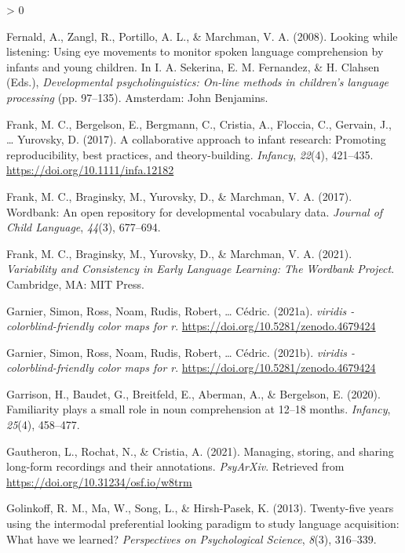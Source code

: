 \documentclass[
  english,
  man,floatsintext]{apa6}
\newlength{\cslhangindent}
\newenvironment{CSLReferences}[2] %
 {%
  \setlength{\parindent}{0pt}
  \ifodd #1 \everypar{\setlength{\hangindent}{\cslhangindent}}\ignorespaces\fi
  \ifnum #2 > 0
  \setlength{\parskip}{#2\baselineskip}
  \fi
 }%
 {}
\begin{document}
\begin{CSLReferences}{1}{0}
\leavevmode\hypertarget{ref-fernald2008}{}%
Fernald, A., Zangl, R., Portillo, A. L., \& Marchman, V. A. (2008). {Looking while listening: Using eye movements to monitor spoken language comprehension by infants and young children}. In I. A. Sekerina, E. M. Fernandez, \& H. Clahsen (Eds.), \emph{Developmental psycholinguistics: On-line methods in children's language processing} (pp. 97--135). Amsterdam: John Benjamins.

\leavevmode\hypertarget{ref-Frank2017a}{}%
Frank, M. C., Bergelson, E., Bergmann, C., Cristia, A., Floccia, C., Gervain, J., \ldots{} Yurovsky, D. (2017). {A collaborative approach to infant research: Promoting reproducibility, best practices, and theory-building}. \emph{Infancy}, \emph{22}(4), 421--435. \url{https://doi.org/10.1111/infa.12182}

\leavevmode\hypertarget{ref-frank2017}{}%
Frank, M. C., Braginsky, M., Yurovsky, D., \& Marchman, V. A. (2017). {Wordbank: An open repository for developmental vocabulary data}. \emph{Journal of Child Language}, \emph{44}(3), 677--694.

\leavevmode\hypertarget{ref-frank2021}{}%
Frank, M. C., Braginsky, M., Yurovsky, D., \& Marchman, V. A. (2021). \emph{{Variability and Consistency in Early Language Learning: The Wordbank Project}}. Cambridge, MA: MIT Press.

\leavevmode\hypertarget{ref-R-viridis}{}%
Garnier, Simon, Ross, Noam, Rudis, Robert, \ldots{} Cédric. (2021a). \emph{{viridis} - colorblind-friendly color maps for r}. \url{https://doi.org/10.5281/zenodo.4679424}

\leavevmode\hypertarget{ref-R-viridisLite}{}%
Garnier, Simon, Ross, Noam, Rudis, Robert, \ldots{} Cédric. (2021b). \emph{{viridis} - colorblind-friendly color maps for r}. \url{https://doi.org/10.5281/zenodo.4679424}

\leavevmode\hypertarget{ref-Garrison2020}{}%
Garrison, H., Baudet, G., Breitfeld, E., Aberman, A., \& Bergelson, E. (2020). {Familiarity plays a small role in noun comprehension at 12--18 months}. \emph{Infancy}, \emph{25}(4), 458--477.

\leavevmode\hypertarget{ref-gautheron_2021}{}%
Gautheron, L., Rochat, N., \& Cristia, A. (2021). Managing, storing, and sharing long-form recordings and their annotations. \emph{PsyArXiv}. Retrieved from \url{https://doi.org/10.31234/osf.io/w8trm}

\leavevmode\hypertarget{ref-golinkoff2013}{}%
Golinkoff, R. M., Ma, W., Song, L., \& Hirsh-Pasek, K. (2013). {Twenty-five years using the intermodal preferential looking paradigm to study language acquisition: What have we learned?} \emph{Perspectives on Psychological Science}, \emph{8}(3), 316--339.


\end{CSLReferences}
\end{document}
